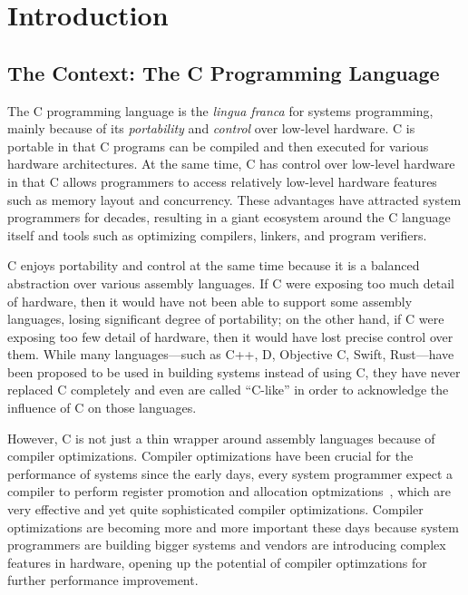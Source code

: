 \section{Introduction}
\label{sec:introduction}

\subsection{The Context: The C Programming Language}

The C programming language is the \emph{lingua franca} for systems programming, mainly because of
its \emph{portability} and \emph{control} over low-level hardware.  C is portable in that C programs
can be compiled and then executed for various hardware architectures.  At the same time, C has
control over low-level hardware in that C allows programmers to access relatively low-level hardware
features such as memory layout and concurrency.  These advantages have attracted system programmers
for decades, resulting in a giant ecosystem around the C language itself and tools such as
optimizing compilers, linkers, and program verifiers.

C enjoys portability and control at the same time because it is a balanced abstraction over various
assembly languages.  If C were exposing too much detail of hardware, then it would have not been
able to support some assembly languages, losing significant degree of portability; on the other
hand, if C were exposing too few detail of hardware, then it would have lost precise control over
them.  While many languages---such as C++, D, Objective C, Swift, Rust---have been proposed to be
used in building systems instead of using C, they have never replaced C completely and even are
called ``C-like'' in order to acknowledge the influence of C on those languages.

However, C is not just a thin wrapper around assembly languages because of compiler optimizations.
Compiler optimizations have been crucial for the performance of systems since the early days, \eg{}
every system programmer expect a compiler to perform register promotion and allocation
optmizations~\cite{reg-prom, reg-alloc}, which are very effective and yet quite sophisticated
compiler optimizations.  Compiler optimizations are becoming more and more important these days
because system programmers are building bigger systems and vendors are introducing complex features
in hardware, opening up the potential of compiler optimzations for further performance improvement.

